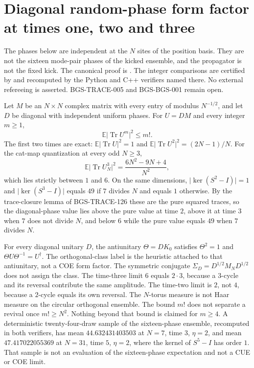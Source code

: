 \section{Diagonal random-phase form factor at times one, two and three}
\label{sec:diagonal-phase-form-factor}
The phases below are independent at the \(N\) sites of the position basis.
They are not the sixteen mode-pair phases of the kicked ensemble, and the
propagator is not the fixed kick. The canonical proof is
.
The integer comparisons are certified by
 and recomputed
by the Python and C++ verifiers named there. No external refereeing is asserted.
BGS-TRACE-005 and BGS-BGS-001 remain open.

\begin{theorem}
\label{thm:diagonal-phase-form-factor}
Let \(M\) be an \(N\times N\) complex matrix with every entry of modulus
\(N^{-1/2}\), and let \(D\) be diagonal with independent uniform phases.
For \(U=DM\) and every integer \(m\ge 1\),
\[
\mathbb E\lvert\operatorname{Tr} U^m\rvert^2\le m!.
\]
The first two times are exact:
\(\mathbb E\lvert\operatorname{Tr} U\rvert^2=1\) and
\(\mathbb E\lvert\operatorname{Tr} U^2\rvert^2=(2N-1)/N\).
For the cat-map quantization at every odd \(N\ge 3\),
\[
\mathbb E\lvert\operatorname{Tr} U_N^3\rvert^2=\frac{6N^2-9N+4}{N^2},
\]
which lies strictly between \(1\) and \(6\). On the same dimensions,
\(\lvert\ker(S^2-I)\rvert=1\) and \(\lvert\ker(S^3-I)\rvert\) equals \(49\)
if \(7\) divides \(N\) and equals \(1\) otherwise. By the trace-closure lemma
of BGS-TRACE-126 these are the pure squared traces, so the diagonal-phase
value lies above the pure value at time \(2\), above it at time \(3\) when
\(7\) does not divide \(N\), and below \(6\) while the pure value equals
\(49\) when \(7\) divides \(N\).

For every diagonal unitary \(D\), the antiunitary \(\Theta=DK_0\) satisfies
\(\Theta^2=1\) and \(\Theta U\Theta^{-1}=U^\dagger\). The orthogonal-class
label is the heuristic attached to that antiunitary, not a COE form factor.
The symmetric conjugate \(\Sigma_D=D^{1/2}M_ND^{1/2}\) does not assign the
class. The
time-three limit \(6\) equals \(2\cdot 3\), because a \(3\)-cycle and its
reversal contribute the same amplitude. The time-two limit is \(2\), not
\(4\), because a \(2\)-cycle equals its own reversal. The \(N\)-torus measure
is not Haar measure on the circular orthogonal ensemble. The bound \(m!\)
does not separate a revival once \(m!\ge N^2\).
Nothing beyond that bound is claimed for \(m\ge 4\). A deterministic
twenty-four-draw sample of the sixteen-phase ensemble, recomputed in both
verifiers, has mean \(44.632431403503\) at \(N=7\), time \(3\), \(\eta=2\),
and mean \(47.417022055369\) at \(N=31\), time \(5\), \(\eta=2\), where the
kernel of \(S^5-I\) has order \(1\). That sample is not an evaluation of
the sixteen-phase expectation and not a CUE or COE limit.
\end{theorem}
